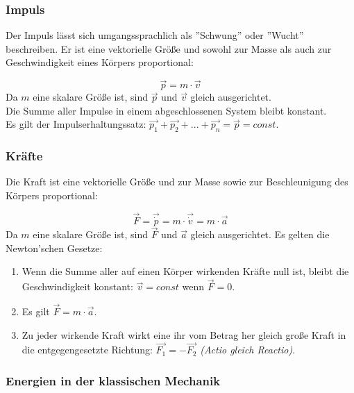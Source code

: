 \documentclass[a4paper]{article}
\begin{document}
			\subsubsection{Impuls}
			
				Der Impuls lässt sich umgangssprachlich als ''Schwung'' oder ''Wucht'' beschreiben. Er ist eine vektorielle Größe und sowohl zur Masse als auch zur Geschwindigkeit eines Körpers proportional:
				
				\begin{equation}
					\vec{p} = m\cdot \vec{v}
				\end{equation}
				Da $m$ eine skalare Größe ist, sind $\vec{p}$ und $\vec{v}$ gleich ausgerichtet.\\
				Die Summe aller Impulse in einem abgeschlossenen System bleibt konstant. \\ Es gilt der Impulserhaltungssatz: $\vec{p_1} + \vec{p_2} + ... + \vec{p_n} = \vec{p} = const$.
			
			\subsubsection{Kräfte}
			
				Die Kraft ist eine vektorielle Größe und zur Masse sowie zur Beschleunigung des Körpers proportional:
				
				\begin{equation}\label{kraft:fma}
					\vec{F} = \vec{\dot{p}} = m\cdot \vec{\dot{v}} = m\cdot \vec{a}
				\end{equation}
				Da $m$ eine skalare Größe ist, sind $\vec{F}$ und $\vec{a}$ gleich ausgerichtet. Es gelten die Newton'schen Gesetze:
				
				\begin{enumerate}
					\item Wenn die Summe aller auf einen Körper wirkenden Kräfte null ist, bleibt die Geschwindigkeit konstant: $\vec{v} = const$ wenn $\vec{F} = 0$.
					\item Es gilt $\vec{F} = m\cdot \vec{a}$.
					\item Zu jeder wirkende Kraft wirkt eine ihr vom Betrag her gleich große Kraft in die entgegengesetzte Richtung: $\vec{F_1} = -\vec{F_2}$ \textit{(Actio gleich Reactio)}.
				\end{enumerate}
		
			\subsubsection{Energien in der klassischen Mechanik}
			
\end{document}

